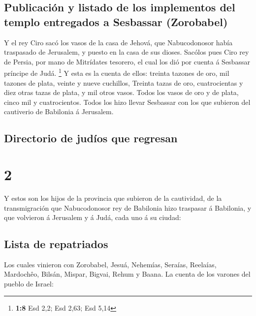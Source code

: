 \hypertarget{publicaciuxf3n-y-listado-de-los-implementos-del-templo-entregados-a-sesbassar-zorobabel}{%
\subsection{Publicación y listado de los implementos del templo
entregados a Sesbassar
(Zorobabel)}\label{publicaciuxf3n-y-listado-de-los-implementos-del-templo-entregados-a-sesbassar-zorobabel}}

 Y el rey Ciro sacó los vasos de la casa de Jehová, que
Nabucodonosor había traspasado de Jerusalem, y puesto en la casa de sus
dioses.  Sacólos pues Ciro rey de Persia, por mano de
Mitrídates tesorero, el cual los dió por cuenta á Sesbassar príncipe de
Judá. \footnote{\textbf{1:8} Esd 2,2; Esd 2,63; Esd 5,14}  Y
esta es la cuenta de ellos: treinta tazones de oro, mil tazones de
plata, veinte y nueve cuchillos,  Treinta tazas de oro,
cuatrocientas y diez otras tazas de plata, y mil otros vasos.
 Todos los vasos de oro y de plata, cinco mil y
cuatrocientos. Todos los hizo llevar Sesbassar con los que subieron del
cautiverio de Babilonia á Jerusalem.

\hypertarget{directorio-de-juduxedos-que-regresan}{%
\subsection{Directorio de judíos que
regresan}\label{directorio-de-juduxedos-que-regresan}}

\hypertarget{section-1}{%
\section{2}\label{section-1}}

 Y estos son los hijos de la provincia que subieron de la
cautividad, de la transmigración que Nabucodonosor rey de Babilonia hizo
traspasar á Babilonia, y que volvieron á Jerusalem y á Judá, cada uno á
su ciudad:

\hypertarget{lista-de-repatriados}{%
\subsection{Lista de repatriados}\label{lista-de-repatriados}}

 Los cuales vinieron con Zorobabel, Jesuá, Nehemías,
Seraías, Reelaías, Mardochêo, Bilsán, Mispar, Bigvai, Rehum y Baana. La
cuenta de los varones del pueblo de Israel:

